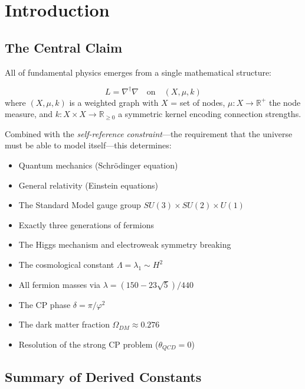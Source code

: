 \documentclass[11pt,a4paper]{article}
\theoremstyle{plain}
\theoremstyle{definition}
\theoremstyle{remark}
\begin{document}
\tableofcontents
\newpage

\section{Introduction}

\subsection{The Central Claim}

All of fundamental physics emerges from a single mathematical structure:
\begin{keyresult}
\begin{equation}
\boxed{L = \nabla^\dagger\nabla \quad \text{on} \quad (X, \mu, k)}
\end{equation}
where $(X, \mu, k)$ is a weighted graph with $X$ = set of nodes, $\mu: X \to \mathbb{R}^+$ the node measure, and $k: X \times X \to \mathbb{R}_{\geq 0}$ a symmetric kernel encoding connection strengths.
\end{keyresult}

Combined with the \emph{self-reference constraint}---the requirement that the universe must be able to model itself---this determines:
\begin{itemize}[noitemsep]
    \item Quantum mechanics (Schrödinger equation)
    \item General relativity (Einstein equations)
    \item The Standard Model gauge group $SU(3) \times SU(2) \times U(1)$
    \item Exactly three generations of fermions
    \item The Higgs mechanism and electroweak symmetry breaking
    \item The cosmological constant $\Lambda = \lambda_1 \sim H^2$
    \item All fermion masses via $\lambda = (150-23\sqrt{5})/440$
    \item The CP phase $\delta = \pi/\varphi^2$
    \item The dark matter fraction $\Omega_{DM} \approx 0.276$
    \item Resolution of the strong CP problem ($\theta_{QCD} = 0$)
\end{itemize}

\subsection{Summary of Derived Constants}
\end{document}
